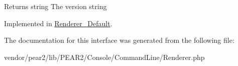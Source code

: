 \begin{DoxyReturn}{\-Returns}
string \-The version string 
\end{DoxyReturn}


\-Implemented in \hyperlink{class_p_e_a_r2_1_1_console_1_1_command_line_1_1_renderer___default_a6080dae0886626b9a4cedb29240708b1}{\-Renderer\-\_\-\-Default}.



\-The documentation for this interface was generated from the following file\-:\begin{DoxyCompactItemize}
\item 
vendor/pear2/lib/\-P\-E\-A\-R2/\-Console/\-Command\-Line/\-Renderer.\-php\end{DoxyCompactItemize}
